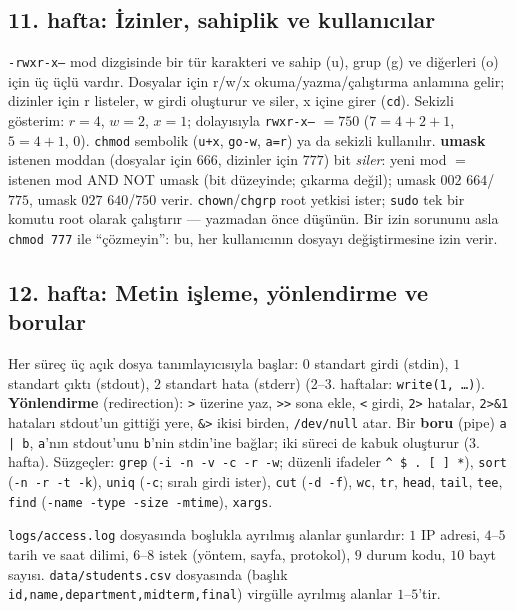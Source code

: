 \documentclass[11pt,a4paper]{article}
\newcommand{\term}[1]{\textbf{\color{mintdeep}#1}}
\newcommand{\cmd}[1]{\texttt{#1}}
\begin{document}
\subsection{11. hafta: İzinler, sahiplik ve kullanıcılar}
\texttt{-rwxr-x---} mod dizgisinde bir tür karakteri ve sahip (u), grup (g) ve diğerleri (o) için üç üçlü vardır. Dosyalar için r/w/x okuma/yazma/çalıştırma anlamına gelir; dizinler için r listeler, w girdi oluşturur ve siler, x içine girer (\cmd{cd}). Sekizli gösterim: $r = 4$, $w = 2$, $x = 1$; dolayısıyla \texttt{rwxr-x---} $= 750$ ($7 = 4+2+1$, $5 = 4+1$, $0$). \cmd{chmod} sembolik (\cmd{u+x}, \cmd{go-w}, \cmd{a=r}) ya da sekizli kullanılır. \term{umask} istenen moddan (dosyalar için $666$, dizinler için $777$) bit \emph{siler}: yeni mod $=$ istenen mod AND NOT umask (bit düzeyinde; çıkarma değil); umask $002$ $664$/$775$, umask $027$ $640$/$750$ verir. \cmd{chown}/\cmd{chgrp} root yetkisi ister; \cmd{sudo} tek bir komutu root olarak çalıştırır --- yazmadan önce düşünün. Bir izin sorununu asla \cmd{chmod 777} ile ``çözmeyin'': bu, her kullanıcının dosyayı değiştirmesine izin verir.


\subsection{12. hafta: Metin işleme, yönlendirme ve borular}
Her süreç üç açık dosya tanımlayıcısıyla başlar: $0$ standart girdi (stdin), $1$ standart çıktı (stdout), $2$ standart hata (stderr) (2--3. haftalar: \cmd{write(1, \dots)}). \term{Yönlendirme} (redirection): \cmd{>} üzerine yaz, \cmd{>>} sona ekle, \cmd{<} girdi, \cmd{2>} hatalar, \cmd{2>\&1} hataları stdout'un gittiği yere, \cmd{\&>} ikisi birden, \cmd{/dev/null} atar. Bir \term{boru} (pipe) \cmd{a | b}, \texttt{a}'nın stdout'unu \texttt{b}'nin stdin'ine bağlar; iki süreci de kabuk oluşturur (3. hafta). Süzgeçler: \cmd{grep} (\cmd{-i -n -v -c -r -w}; düzenli ifadeler \texttt{\^{} \$ . [ ] *}), \cmd{sort} (\cmd{-n -r -t -k}), \cmd{uniq} (\cmd{-c}; sıralı girdi ister), \cmd{cut} (\cmd{-d -f}), \cmd{wc}, \cmd{tr}, \cmd{head}, \cmd{tail}, \cmd{tee}, \cmd{find} (\cmd{-name -type -size -mtime}), \cmd{xargs}.

\texttt{logs/access.log} dosyasında boşlukla ayrılmış alanlar şunlardır: $1$ IP adresi, $4$--$5$ tarih ve saat dilimi, $6$--$8$ istek (yöntem, sayfa, protokol), $9$ durum kodu, $10$ bayt sayısı. \texttt{data/students.csv} dosyasında (başlık \texttt{id,name,department,midterm,final}) virgülle ayrılmış alanlar $1$--$5$'tir.
\end{document}

